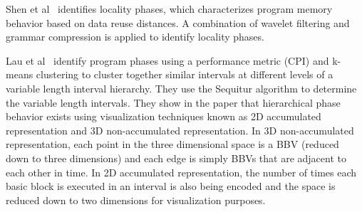 Shen et al~\cite{Shen:2004:LPP} identifies locality phases, which characterizes program memory behavior based on data reuse distances. A combination of wavelet filtering and grammar compression is applied to identify locality phases. 

Lau et al~\cite{Lau:2005:MVL} identify program phases using a performance metric (CPI) and k-means clustering to cluster together similar intervals at different levels of a variable length interval hierarchy. They use the Sequitur algorithm to determine the variable length intervals. They show in the paper that hierarchical phase behavior exists using visualization techniques known as 2D accumulated representation and 3D non-accumulated representation. In 3D non-accumulated representation, each point in the three dimensional space is a BBV (reduced down to three dimensions) and each edge is simply BBVs that are adjacent to each other in time. In 2D accumulated representation, the number of times each basic block is executed in an interval is also being encoded and the space is reduced down to two dimensions for visualization purposes. 

